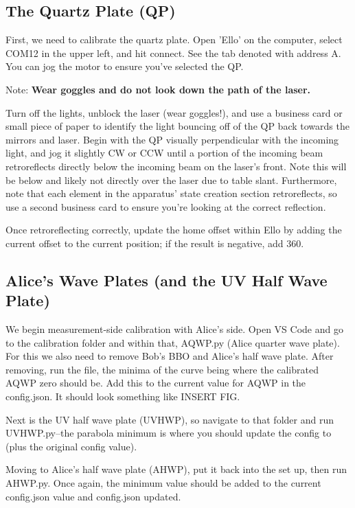 \documentclass{paper}[11pt]
\begin{document}
\subsection{The Quartz Plate (QP)}
First, we need to calibrate the quartz plate. Open 'Ello' on the computer, select COM12 in the upper left, and hit connect. See the tab denoted with address A. You can jog the motor to ensure you've selected the QP. 

Note: \textbf{Wear goggles and do not look down the path of the laser.}

Turn off the lights, unblock the laser (wear goggles!), and use a business card or small piece of paper to identify the light bouncing off of the QP back towards the mirrors and laser. Begin with the QP visually perpendicular with the incoming light, and jog it slightly CW or CCW until a portion of the incoming beam retroreflects directly below the incoming beam on the laser's front. Note this will be below and likely not directly over the laser due to table slant. Furthermore, note that each element in the apparatus' state creation section retroreflects, so use a second business card to ensure you're looking at the correct reflection.

Once retroreflecting correctly, update the home offset within Ello by adding the current offset to the current position; if the result is negative, add 360. 

\subsection{Alice's Wave Plates (and the UV Half Wave Plate)}
We begin measurement-side calibration with Alice's side. Open VS Code and go to the calibration folder and within that, AQWP.py (Alice quarter wave plate). For this we also need to remove Bob's BBO and Alice's half wave plate. After removing, run the file, the minima of the curve being where the calibrated AQWP zero should be. Add this to the current value for AQWP in the config.json. It should look something like INSERT FIG.

Next is the UV half wave plate (UVHWP), so navigate to that folder and run UVHWP.py--the parabola minimum is where you should update the config to (plus the original config value). 

Moving to Alice's half wave plate (AHWP), put it back into the set up, then run AHWP.py. Once again, the minimum value should be added to the current config.json value and config.json updated. 
\end{document}
